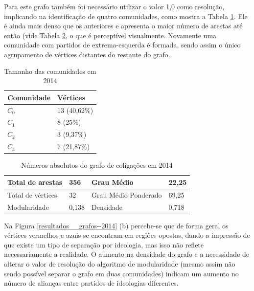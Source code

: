 
Para este grafo também foi necessário utilizar o valor 1,0 como resolução, implicando na identificação de quatro comunidades, como mostra a Tabela \ref{table-2014a}. Ele é ainda mais denso que os anteriores e apresenta o maior número de arestas até então (vide Tabela \ref{table-2014b}, o que é perceptível visualmente. Novamente uma comunidade com partidos de extrema-esquerda é formada, sendo assim o único agrupamento de vértices distantes do restante do grafo. 
\begin{table}[H]
\centering
\begin{tabular}{|l|l|}
\hline
Comunidade & Vértices \\ \hline
$C_0$         &     13 (40,62\%)                \\ \hline
$C_1$         &     8 (25\%)                \\ \hline
$C_2$         &       3 (9,37\%)               \\ \hline
$C_3$         &       7 (21,87\%)               \\ \hline
\end{tabular}
\caption{Tamanho das comunidades em 2014}
\label{table-2014a}
\end{table}


\begin{table}[H]
\centering
\begin{tabular}{|l|l|l|l|}
\hline
Total de arestas  & 356 & Grau Médio           & 22,25 \\ \hline
Total de vértices & 32 & Grau Médio Ponderado & 69,25 \\ \hline
Modularidade      & 0,138 & Densidade            & 0,718 \\ \hline
\end{tabular}
\caption{Números absolutos do grafo de coligações em 2014}
\label{table-2014b}
\end{table}

Na Figura \ref{resultados__grafos--2014} (b) percebe-se que de forma geral os vértices vermelhos e azuis se encontram em regiões opostas, dando a impressão de que existe um tipo de separação por ideologia, mas isso não reflete necessariamente a realidade. O aumento na densidade do grafo e a necessidade de alterar o valor de resolução do algoritmo  de modularidade (mesmo assim não sendo possível separar o grafo em duas comunidades) indicam um aumento no número de alianças entre partidos de ideologias diferentes. 


